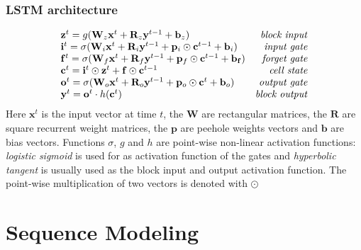 \documentclass{beamer}
\begin{document}
\begin{frame}
  \frametitle{LSTM architecture}

  \begin{equation*}
    \begin{array}{lr}
      \mathbf{z}^{t}=g(\mathbf{W}_{z}\mathbf{x}^{t}+\mathbf{R}_{z}\mathbf{y}^{t-1}+\mathbf{b}_{z}) & \text{\emph{block input}} \\
      \mathbf{i}^{t}=\sigma(\mathbf{W}_{i}\mathbf{x}^{t}+\mathbf{R}_{i}\mathbf{y}^{t-1}+\mathbf{p}_{i}\odot\mathbf{c}^{t-1}+\mathbf{b}_{i}) & \text{\emph{input gate}} \\
      \mathbf{f}^{t}=\sigma(\mathbf{W}_{f}\mathbf{x}^{t}+\mathbf{R}_{f}\mathbf{y}^{t-1}+\mathbf{p}_{f}\odot\mathbf{c}^{t-1}+\mathbf{b_{f}}) & \text{\emph{forget gate}} \\
      \mathbf{c}^{t}=\mathbf{i}^{t}\odot\mathbf{z}^{t}+\mathbf{f}\odot\mathbf{c}^{t-1} & \text{\emph{cell state}} \\
      \mathbf{o}^{t}=\sigma(\mathbf{W}_{o}\mathbf{x}^{t}+\mathbf{R}_{o}\mathbf{y}^{t-1}+\mathbf{p}_{o}\odot\mathbf{c}^{t}+\mathbf{b}_{o}) & \text{\emph{output gate}} \\
      \mathbf{y}^{t}=\mathbf{o}^{t}\cdot h(\mathbf{c}^{t}) & \text{\emph{block output}}
    \end{array}
  \end{equation*}
  Here $\mathbf{x}^{t}$ is the input vector at time $t$, the $\mathbf{W}$ are rectangular matrices, the $\mathbf{R}$ are square recurrent weight matrices, the $\mathbf{p}$ are peehole weights vectors and $\mathbf{b}$ are bias vectors. Functions $\sigma$, $g$ and $h$ are point-wise non-linear activation functions: \emph{logistic sigmoid} is used for as activation function of the gates and \emph{hyperbolic tangent} is usually used as the block input and output activation function. The point-wise multiplication of two vectors is denoted with $\odot$
\end{frame}

\section{Sequence Modeling}
\end{document}
